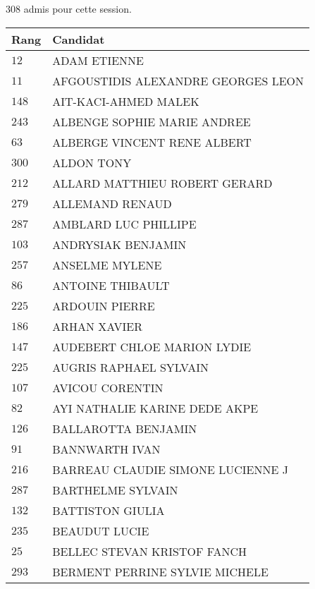 



  $308$ admis pour cette session.

  \begin{xltabular}{\linewidth}{|l|X|}
    \hline
    \textbf{Rang} & \textbf{Candidat} \\
    \hline
    $12$ & ADAM ETIENNE \\
    \hline
    $11$ & AFGOUSTIDIS ALEXANDRE GEORGES LEON \\
    \hline
    $148$ & AIT-KACI-AHMED MALEK \\
    \hline
    $243$ & ALBENGE SOPHIE MARIE ANDREE \\
    \hline
    $63$ & ALBERGE VINCENT RENE ALBERT \\
    \hline
    $300$ & ALDON TONY \\
    \hline
    $212$ & ALLARD MATTHIEU ROBERT GERARD \\
    \hline
    $279$ & ALLEMAND RENAUD \\
    \hline
    $287$ & AMBLARD LUC PHILLIPE \\
    \hline
    $103$ & ANDRYSIAK BENJAMIN \\
    \hline
    $257$ & ANSELME MYLENE \\
    \hline
    $86$ & ANTOINE THIBAULT \\
    \hline
    $225$ & ARDOUIN PIERRE \\
    \hline
    $186$ & ARHAN XAVIER \\
    \hline
    $147$ & AUDEBERT CHLOE MARION LYDIE \\
    \hline
    $225$ & AUGRIS RAPHAEL SYLVAIN \\
    \hline
    $107$ & AVICOU CORENTIN \\
    \hline
    $82$ & AYI NATHALIE KARINE DEDE AKPE \\
    \hline
    $126$ & BALLAROTTA BENJAMIN \\
    \hline
    $91$ & BANNWARTH IVAN \\
    \hline
    $216$ & BARREAU CLAUDIE SIMONE LUCIENNE J \\
    \hline
    $287$ & BARTHELME SYLVAIN \\
    \hline
    $132$ & BATTISTON GIULIA \\
    \hline
    $235$ & BEAUDUT LUCIE \\
    \hline
    $25$ & BELLEC STEVAN KRISTOF FANCH \\
    \hline
    $293$ & BERMENT PERRINE SYLVIE MICHELE \\

\end{xltabular}

